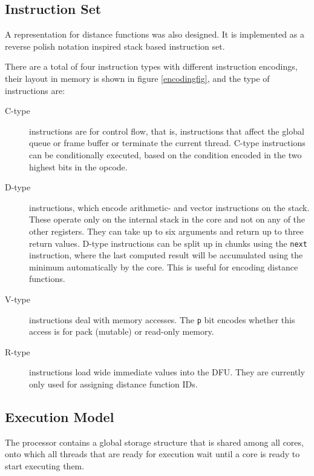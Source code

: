 		\subsection{Instruction Set}

			A representation for distance functions was also designed. It is
			implemented as a reverse polish notation inspired stack based 
			instruction set.

			There are a total of four instruction types with different
			instruction encodings, their layout in memory is shown in figure
			\ref{encodingfig}, and the type of instructions are:

			\begin{description}
				\item[C-type] instructions are for control flow, that is, 
					instructions that affect the global queue or frame buffer or
					terminate the current thread. C-type instructions can be 
					conditionally executed, based on the condition encoded in
					the two highest bits in the opcode. 

				\item[D-type] instructions, which encode arithmetic- and vector
					instructions on the stack. These operate only on the
					internal stack in the core and not on any of the other
					registers. They can take up to six arguments and return up
					to three return values. D-type instructions can be split up
					in chunks using the \texttt{next} instruction, where the
					last computed result will be accumulated using the minimum
					automatically by the core.  This is useful for encoding
					distance functions.

				\item[V-type] instructions deal with memory accesses. The
					\texttt{p} bit encodes whether this access is for pack
					(mutable) or read-only memory.

				\item[R-type] instructions load wide immediate values into the
					DFU. They are currently only used for assigning distance
					function IDs.
			\end{description}

		\subsection{Execution Model}

			The processor contains a global storage structure that is shared
			among all cores, onto which all threads that are ready for
			execution wait until a core is ready to start executing them.

